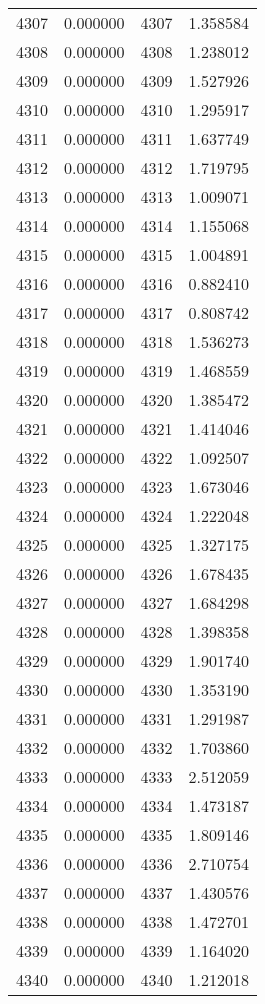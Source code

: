 \documentclass[12pt]{article}
\begin{document}
\begin{longtable}{@{}cccc@{}}
4307 & 0.000000 & 4307 & 1.358584 \\
4308 & 0.000000 & 4308 & 1.238012 \\
4309 & 0.000000 & 4309 & 1.527926 \\
4310 & 0.000000 & 4310 & 1.295917 \\
4311 & 0.000000 & 4311 & 1.637749 \\
4312 & 0.000000 & 4312 & 1.719795 \\
4313 & 0.000000 & 4313 & 1.009071 \\
4314 & 0.000000 & 4314 & 1.155068 \\
4315 & 0.000000 & 4315 & 1.004891 \\
4316 & 0.000000 & 4316 & 0.882410 \\
4317 & 0.000000 & 4317 & 0.808742 \\
4318 & 0.000000 & 4318 & 1.536273 \\
4319 & 0.000000 & 4319 & 1.468559 \\
4320 & 0.000000 & 4320 & 1.385472 \\
4321 & 0.000000 & 4321 & 1.414046 \\
4322 & 0.000000 & 4322 & 1.092507 \\
4323 & 0.000000 & 4323 & 1.673046 \\
4324 & 0.000000 & 4324 & 1.222048 \\
4325 & 0.000000 & 4325 & 1.327175 \\
4326 & 0.000000 & 4326 & 1.678435 \\
4327 & 0.000000 & 4327 & 1.684298 \\
4328 & 0.000000 & 4328 & 1.398358 \\
4329 & 0.000000 & 4329 & 1.901740 \\
4330 & 0.000000 & 4330 & 1.353190 \\
4331 & 0.000000 & 4331 & 1.291987 \\
4332 & 0.000000 & 4332 & 1.703860 \\
4333 & 0.000000 & 4333 & 2.512059 \\
4334 & 0.000000 & 4334 & 1.473187 \\
4335 & 0.000000 & 4335 & 1.809146 \\
4336 & 0.000000 & 4336 & 2.710754 \\
4337 & 0.000000 & 4337 & 1.430576 \\
4338 & 0.000000 & 4338 & 1.472701 \\
4339 & 0.000000 & 4339 & 1.164020 \\
4340 & 0.000000 & 4340 & 1.212018 \\

\end{longtable}
\end{document}
